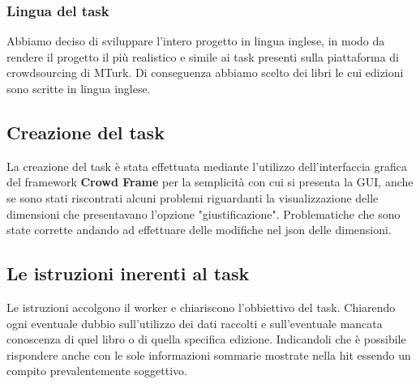 \documentclass[a4paper,11pt]{report}
\begin{document}
\subsubsection{Lingua del task}
Abbiamo deciso di sviluppare l'intero progetto in lingua inglese, in modo da rendere il progetto il più realistico e simile ai task presenti sulla piattaforma di crowdsourcing di MTurk. Di conseguenza abbiamo scelto dei libri le cui edizioni sono scritte in lingua inglese.

\subsection{Creazione del task}
La creazione del task è stata effettuata mediante l'utilizzo dell'interfaccia grafica del framework \textbf{Crowd Frame} per la semplicità con cui si presenta la GUI, anche se sono stati riscontrati alcuni problemi riguardanti la visualizzazione delle dimensioni che presentavano l'opzione "giustificazione". Problematiche che sono state corrette andando ad effettuare delle modifiche nel json delle dimensioni. 


\subsection{Le istruzioni inerenti al task}
Le istruzioni accolgono il worker e chiariscono l'obbiettivo del task. Chiarendo ogni eventuale dubbio sull'utilizzo dei dati raccolti e sull'eventuale mancata conoscenza di quel libro o di quella specifica edizione. Indicandoli che è possibile rispondere anche con le sole informazioni sommarie mostrate nella hit essendo un compito prevalentemente soggettivo.


\begin{figure}[h]
	\centering
	\label{fig:followers}
\end{figure}

\pagebreak
\end{document}

